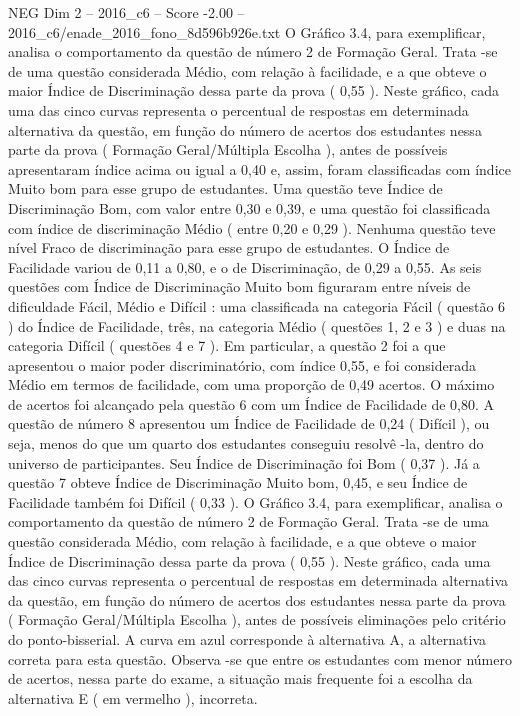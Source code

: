 \begin{textsample}{NEG Dim 2 – 2016\_c6 – Score -2.00 – 2016\_c6/enade\_2016\_fono\_8d596b926e.txt}
O Gráfico 3.4, para exemplificar, analisa o comportamento da questão de número 2 de Formação Geral.
Trata -se de uma questão considerada Médio, com relação à facilidade, e a que obteve o maior Índice de Discriminação dessa parte da prova ( 0,55 ).
Neste gráfico, cada uma das cinco curvas representa o percentual de respostas em determinada alternativa da questão, em função do número de acertos dos estudantes nessa parte da prova ( Formação Geral/Múltipla Escolha ), antes de possíveis apresentaram índice acima ou igual a 0,40 e, assim, foram classificadas com índice Muito bom para esse grupo de estudantes.
Uma questão teve Índice de Discriminação Bom, com valor entre 0,30 e 0,39, e uma questão foi classificada com índice de discriminação Médio ( entre 0,20 e 0,29 ).
Nenhuma questão teve nível Fraco de discriminação para esse grupo de estudantes.
O Índice de Facilidade variou de 0,11 a 0,80, e o de Discriminação, de 0,29 a 0,55.
As seis questões com Índice de Discriminação Muito bom figuraram entre níveis de dificuldade Fácil, Médio e Difícil : uma classificada na categoria Fácil ( questão 6 ) do Índice de Facilidade, três, na categoria Médio ( questões 1, 2 e 3 ) e duas na categoria Difícil ( questões 4 e 7 ).
Em particular, a questão 2 foi a que apresentou o maior poder discriminatório, com índice 0,55, e foi considerada Médio em termos de facilidade, com uma proporção de 0,49 acertos.
O máximo de acertos foi alcançado pela questão 6 com um Índice de Facilidade de 0,80.
A questão de número 8 apresentou um Índice de Facilidade de 0,24 ( Difícil ), ou seja, menos do que um quarto dos estudantes conseguiu resolvê -la, dentro do universo de participantes.
Seu Índice de Discriminação foi Bom ( 0,37 ).
Já a questão 7 obteve Índice de Discriminação Muito bom, 0,45, e seu Índice de Facilidade também foi Difícil ( 0,33 ).
O Gráfico 3.4, para exemplificar, analisa o comportamento da questão de número 2 de Formação Geral.
Trata -se de uma questão considerada Médio, com relação à facilidade, e a que obteve o maior Índice de Discriminação dessa parte da prova ( 0,55 ).
Neste gráfico, cada uma das cinco curvas representa o percentual de respostas em determinada alternativa da questão, em função do número de acertos dos estudantes nessa parte da prova ( Formação Geral/Múltipla Escolha ), antes de possíveis eliminações pelo critério do ponto-bisserial.
A curva em azul corresponde à alternativa A, a alternativa correta para esta questão.
Observa -se que entre os estudantes com menor número de acertos, nessa parte do exame, a situação mais frequente foi a escolha da alternativa E ( em vermelho ), incorreta.

\end{textsample}
